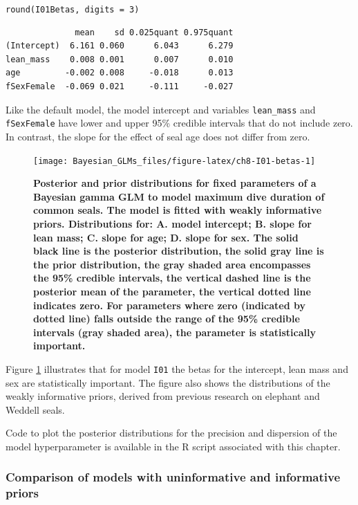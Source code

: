 \documentclass[
]{book}
\begin{document}
\texttt{round(I01Betas,\ digits\ =\ 3)}

\begin{verbatim}
              mean    sd 0.025quant 0.975quant
(Intercept)  6.161 0.060      6.043      6.279
lean_mass    0.008 0.001      0.007      0.010
age         -0.002 0.008     -0.018      0.013
fSexFemale  -0.069 0.021     -0.111     -0.027
\end{verbatim}

Like the default model, the model intercept and variables \texttt{lean\_mass} and \texttt{fSexFemale} have lower and upper 95\% credible intervals that do not include zero. In contrast, the slope for the effect of seal age does not differ from zero.



\begin{figure}

{\centering \texttt{[image: Bayesian\_GLMs\_files/figure-latex/ch8-I01-betas-1]} 

}

\caption{\textbf{Posterior and prior distributions for fixed parameters of a Bayesian gamma GLM to model maximum dive duration of common seals. The model is fitted with weakly informative priors. Distributions for: A. model intercept; B. slope for lean mass; C. slope for age; D. slope for sex. The solid black line is the posterior distribution, the solid gray line is the prior distribution, the gray shaded area encompasses the 95\% credible intervals, the vertical dashed line is the posterior mean of the parameter, the vertical dotted line indicates zero. For parameters where zero (indicated by dotted line) falls outside the range of the 95\% credible intervals (gray shaded area), the parameter is statistically important.}}\label{fig:ch8-I01-betas}
\end{figure}

Figure \ref{fig:ch8-I01-betas} illustrates that for model \texttt{I01} the betas for the intercept, lean mass and sex are statistically important. The figure also shows the distributions of the weakly informative priors, derived from previous research on elephant and Weddell seals.

Code to plot the posterior distributions for the precision and dispersion of the model hyperparameter is available in the R script associated with this chapter.

\hypertarget{gamma-prior-comp}{%
\subsubsection{Comparison of models with uninformative and informative priors}\label{gamma-prior-comp}}
\end{document}

